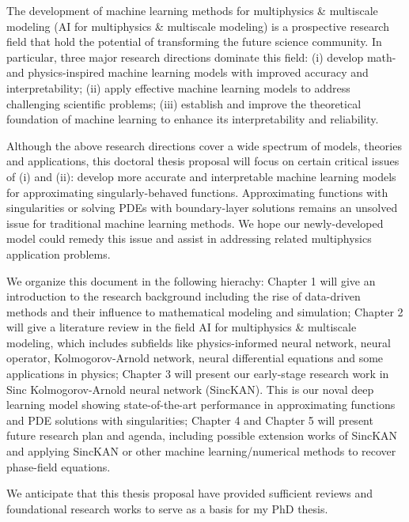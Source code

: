 
The development of machine learning methods for multiphysics \& multiscale modeling (AI for multiphysics \& multiscale modeling) is a prospective research field that hold the potential of transforming the future science community. In particular, three major research directions dominate this field: (i) develop math- and physics-inspired machine learning models with improved accuracy and interpretability; (ii) apply effective machine learning models to address challenging scientific problems; (iii) establish and improve the theoretical foundation of machine learning to enhance its interpretability and reliability.

Although the above research directions cover a wide spectrum of models, theories and applications, this doctoral thesis proposal will focus on certain critical issues of (i) and (ii): develop more accurate and interpretable machine learning models for approximating singularly-behaved functions. Approximating functions with singularities or solving PDEs with boundary-layer solutions remains an unsolved issue for traditional machine learning methods. We hope our newly-developed model could remedy this issue and assist in addressing related multiphysics application problems.

We organize this document in the following hierachy: Chapter 1 will give an introduction to the research background including the rise of data-driven methods and their influence to mathematical modeling and simulation; Chapter 2 will give a literature review in the field AI for multiphysics \& multiscale modeling, which includes subfields like physics-informed neural network, neural operator, Kolmogorov-Arnold network, neural differential equations and some applications in physics; Chapter 3 will present our early-stage research work in Sinc Kolmogorov-Arnold neural network (SincKAN). This is our noval deep learning model showing state-of-the-art performance in approximating functions and PDE solutions with singularities; Chapter 4 and Chapter 5 will present future research plan and agenda, including possible extension works of SincKAN and applying SincKAN or other machine learning/numerical methods to recover phase-field equations.

We anticipate that this thesis proposal have provided sufficient reviews and foundational research works to serve as a basis for my PhD thesis.




